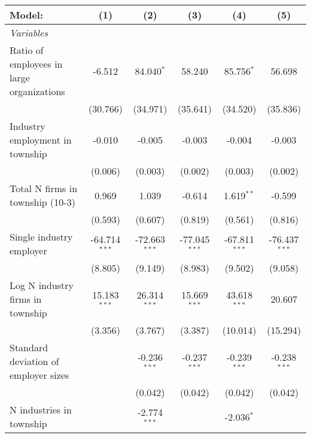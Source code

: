 \begingroup
\centering
\begin{tabular}{lccccc}
   \tabularnewline \midrule \midrule
   Model:                                    & (1)             & (2)             & (3)             & (4)             & (5)\\  
   \midrule
   \emph{Variables}\\
   Ratio of employees in large organizations & -6.512          & 84.040$^{*}$    & 58.240          & 85.756$^{*}$    & 56.698\\   
                                             & (30.766)        & (34.971)        & (35.641)        & (34.520)        & (35.836)\\   
   Industry employment in township           & -0.010          & -0.005          & -0.003          & -0.004          & -0.003\\   
                                             & (0.006)         & (0.003)         & (0.002)         & (0.003)         & (0.002)\\   
   Total N firms in township (10-3)          & 0.969           & 1.039           & -0.614          & 1.619$^{**}$    & -0.599\\   
                                             & (0.593)         & (0.607)         & (0.819)         & (0.561)         & (0.816)\\   
   Single industry employer                  & -64.714$^{***}$ & -72.663$^{***}$ & -77.045$^{***}$ & -67.811$^{***}$ & -76.437$^{***}$\\   
                                             & (8.805)         & (9.149)         & (8.983)         & (9.502)         & (9.058)\\   
   Log N industry firms in township          & 15.183$^{***}$  & 26.314$^{***}$  & 15.669$^{***}$  & 43.618$^{***}$  & 20.607\\   
                                             & (3.356)         & (3.767)         & (3.387)         & (10.014)        & (15.294)\\   
   Standard deviation of employer sizes      &                 & -0.236$^{***}$  & -0.237$^{***}$  & -0.239$^{***}$  & -0.238$^{***}$\\   
                                             &                 & (0.042)         & (0.042)         & (0.042)         & (0.042)\\   
   N industries in township                  &                 & -2.774$^{***}$  &                 & -2.036$^{*}$    &   \\   

\end{tabular}
